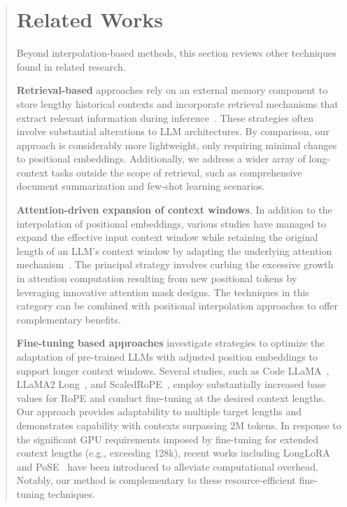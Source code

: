 \begin{abstract}
\section{Related Works}

Beyond interpolation-based methods, this section reviews other techniques found in related research.

\textbf{Retrieval-based} approaches rely on an external memory component to store lengthy historical contexts and incorporate retrieval mechanisms that extract relevant information during inference~\cite{longllama,wang2023augmenting,borgeaud2022improving}. These strategies often involve substantial alterations to LLM architectures. By comparison, our approach is considerably more lightweight, only requiring minimal changes to positional embeddings. Additionally, we address a wider array of long-context tasks outside the scope of retrieval, such as comprehensive document summarization and few-shot learning scenarios.

\textbf{Attention-driven expansion of context windows}. In addition to the interpolation of positional embeddings, various studies have managed to expand the effective input context window while retaining the original length of an LLM’s context window by adapting the underlying attention mechanism~\cite{han2023lminfinite, streamingllm,parallelwindow}. The principal strategy involves curbing the excessive growth in attention computation resulting from new positional tokens by leveraging innovative attention mask designs. The techniques in this category can be combined with positional interpolation approaches to offer complementary benefits.

\textbf{Fine-tuning based approaches} investigate strategies to optimize the adaptation of pre-trained LLMs with adjusted position embeddings to support longer context windows. Several studies, such as Code LLaMA~\cite{codellama}, LLaMA2 Long~\cite{xiong2023effective}, and ScaledRoPE~\cite{liu2023scaling}, employ substantially increased base values for RoPE and conduct fine-tuning at the desired context lengths. Our approach provides adaptability to multiple target lengths and demonstrates capability with contexts surpassing 2M tokens. In response to the significant GPU requirements imposed by fine-tuning for extended context lengths (e.g., exceeding 128k), recent works including LongLoRA~\cite{longlora} and PoSE~\cite{zhu2023pose} have been introduced to alleviate computational overhead. Notably, our method is complementary to these resource-efficient fine-tuning techniques.


\end{abstract}
